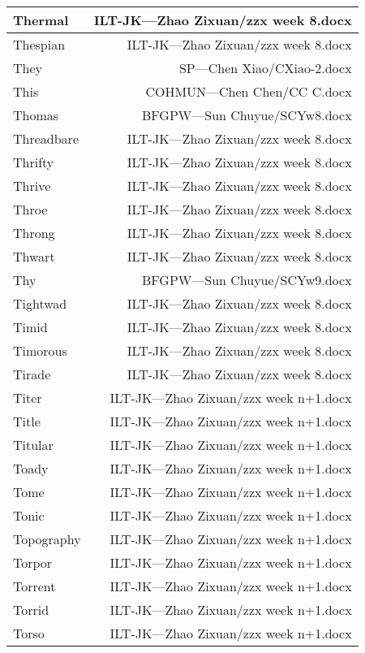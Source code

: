 \documentclass{article}
\begin{document}
\begin{center}
\begin{longtable}{|l|r|}
\hline
Thermal  &  ILT-JK---Zhao Zixuan/zzx week 8.docx\\  
\hline
Thespian  &  ILT-JK---Zhao Zixuan/zzx week 8.docx\\  
\hline
They  &  SP---Chen Xiao/CXiao-2.docx\\  
\hline
This  &  COHMUN---Chen Chen/CC C.docx\\  
\hline
Thomas  &  BFGPW---Sun Chuyue/SCYw8.docx\\  
\hline
Threadbare  &  ILT-JK---Zhao Zixuan/zzx week 8.docx\\  
\hline
Thrifty  &  ILT-JK---Zhao Zixuan/zzx week 8.docx\\  
\hline
Thrive  &  ILT-JK---Zhao Zixuan/zzx week 8.docx\\  
\hline
Throe  &  ILT-JK---Zhao Zixuan/zzx week 8.docx\\  
\hline
Throng  &  ILT-JK---Zhao Zixuan/zzx week 8.docx\\  
\hline
Thwart  &  ILT-JK---Zhao Zixuan/zzx week 8.docx\\  
\hline
Thy  &  BFGPW---Sun Chuyue/SCYw9.docx\\  
\hline
Tightwad  &  ILT-JK---Zhao Zixuan/zzx week 8.docx\\  
\hline
Timid  &  ILT-JK---Zhao Zixuan/zzx week 8.docx\\  
\hline
Timorous  &  ILT-JK---Zhao Zixuan/zzx week 8.docx\\  
\hline
Tirade  &  ILT-JK---Zhao Zixuan/zzx week 8.docx\\  
\hline
Titer  &  ILT-JK---Zhao Zixuan/zzx week n+1.docx\\  
\hline
Title  &  ILT-JK---Zhao Zixuan/zzx week n+1.docx\\  
\hline
Titular  &  ILT-JK---Zhao Zixuan/zzx week n+1.docx\\  
\hline
Toady  &  ILT-JK---Zhao Zixuan/zzx week n+1.docx\\  
\hline
Tome  &  ILT-JK---Zhao Zixuan/zzx week n+1.docx\\  
\hline
Tonic  &  ILT-JK---Zhao Zixuan/zzx week n+1.docx\\  
\hline
Topography  &  ILT-JK---Zhao Zixuan/zzx week n+1.docx\\  
\hline
Torpor  &  ILT-JK---Zhao Zixuan/zzx week n+1.docx\\  
\hline
Torrent  &  ILT-JK---Zhao Zixuan/zzx week n+1.docx\\  
\hline
Torrid  &  ILT-JK---Zhao Zixuan/zzx week n+1.docx\\  
\hline
Torso  &  ILT-JK---Zhao Zixuan/zzx week n+1.docx\\  

\end{longtable}
\end{center}
\end{document}
